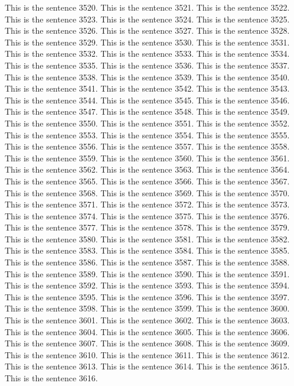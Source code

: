 \documentclass{article}
\begin{document}
This is the sentence 3520.
This is the sentence 3521.
This is the sentence 3522.
This is the sentence 3523.
This is the sentence 3524.
This is the sentence 3525.
This is the sentence 3526.
This is the sentence 3527.
This is the sentence 3528.
This is the sentence 3529.
This is the sentence 3530.
This is the sentence 3531.
This is the sentence 3532.
This is the sentence 3533.
This is the sentence 3534.
This is the sentence 3535.
This is the sentence 3536.
This is the sentence 3537.
This is the sentence 3538.
This is the sentence 3539.
This is the sentence 3540.
This is the sentence 3541.
This is the sentence 3542.
This is the sentence 3543.
This is the sentence 3544.
This is the sentence 3545.
This is the sentence 3546.
This is the sentence 3547.
This is the sentence 3548.
This is the sentence 3549.
This is the sentence 3550.
This is the sentence 3551.
This is the sentence 3552.
This is the sentence 3553.
This is the sentence 3554.
This is the sentence 3555.
This is the sentence 3556.
This is the sentence 3557.
This is the sentence 3558.
This is the sentence 3559.
This is the sentence 3560.
This is the sentence 3561.
This is the sentence 3562.
This is the sentence 3563.
This is the sentence 3564.
This is the sentence 3565.
This is the sentence 3566.
This is the sentence 3567.
This is the sentence 3568.
This is the sentence 3569.
This is the sentence 3570.
This is the sentence 3571.
This is the sentence 3572.
This is the sentence 3573.
This is the sentence 3574.
This is the sentence 3575.
This is the sentence 3576.
This is the sentence 3577.
This is the sentence 3578.
This is the sentence 3579.
This is the sentence 3580.
This is the sentence 3581.
This is the sentence 3582.
This is the sentence 3583.
This is the sentence 3584.
This is the sentence 3585.
This is the sentence 3586.
This is the sentence 3587.
This is the sentence 3588.
This is the sentence 3589.
This is the sentence 3590.
This is the sentence 3591.
This is the sentence 3592.
This is the sentence 3593.
This is the sentence 3594.
This is the sentence 3595.
This is the sentence 3596.
This is the sentence 3597.
This is the sentence 3598.
This is the sentence 3599.
This is the sentence 3600.
This is the sentence 3601.
This is the sentence 3602.
This is the sentence 3603.
This is the sentence 3604.
This is the sentence 3605.
This is the sentence 3606.
This is the sentence 3607.
This is the sentence 3608.
This is the sentence 3609.
This is the sentence 3610.
This is the sentence 3611.
This is the sentence 3612.
This is the sentence 3613.
This is the sentence 3614.
This is the sentence 3615.
This is the sentence 3616.
\end{document}

